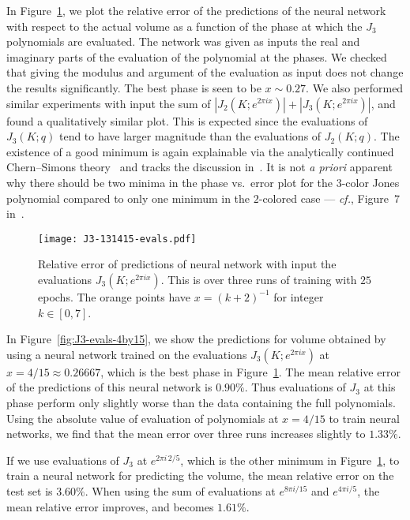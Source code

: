 \documentclass[11pt]{article}
\begin{document}
In Figure~\ref{fig:J3-phases-rel-err}, we plot the relative error of the predictions of the neural network with respect to the actual volume as a function of the phase at which the $J_3$ polynomials are evaluated.
The network was given as inputs the real and imaginary parts of the evaluation of the polynomial at the phases.
We checked that giving the modulus and argument of the evaluation as input does not change the results significantly.
The best phase is seen to be $x\sim0.27$.
We also performed similar experiments with input the sum of $|J_2(K;e^{2\pi ix})|+|J_3(K;e^{2\pi ix})|$, and found a qualitatively similar plot.
This is expected since the evaluations of $J_3(K;q)$ tend to have larger magnitude than the evaluations of $J_2(K;q)$.
The existence of a good minimum is again explainable via the analytically continued Chern--Simons theory~\cite{witten2011analytic} and tracks the discussion in~\cite{Craven:2020bdz}.
It is not \textit{a priori} apparent why there should be two minima in the phase vs.\ error plot for the $3$-color Jones polynomial compared to only one minimum in the $2$-colored case --- \textit{cf.}, Figure~7 in~\cite{Craven:2020bdz}.

\begin{figure}[h]
    \centering
    \texttt{[image: J3-131415-evals.pdf]} 
    \caption{\textsf{Relative error of predictions of neural network with input the evaluations $J_3(K;e^{2\pi i x})$. This is over three runs of training with $25$ epochs. The orange points have $x=(k+2)^{-1}$ for integer $k\in[0,7]$.}}
    \label{fig:J3-phases-rel-err}
\end{figure}

In Figure~\ref{fig:J3-evals-4by15}, we show the predictions for volume obtained by using a neural network trained on the evaluations $J_3(K;e^{2\pi ix})$ at $x=4/15\approx 0.26667$, which is the best phase in Figure~\ref{fig:J3-phases-rel-err}.
The mean relative error of the predictions of this neural network is $0.90\%$.
Thus evaluations of $J_3$ at this phase perform only slightly worse than the data containing the full polynomials.
Using the absolute value of evaluation of polynomials at $x=4/15$ to train neural networks, we find that the mean error over three runs increases slightly to $1.33\%$.

If we use evaluations of $J_3$ at $e^{2\pi i\,2/5}$, which is the other minimum in Figure~\ref{fig:J3-phases-rel-err}, to train a neural network for predicting the volume, the mean relative error on the test set is $3.60\%$.
When using the sum of evaluations at $e^{8\pi i/15}$ and $e^{4\pi i/5}$, the mean relative error improves, and becomes $1.61\%$.
\end{document}
